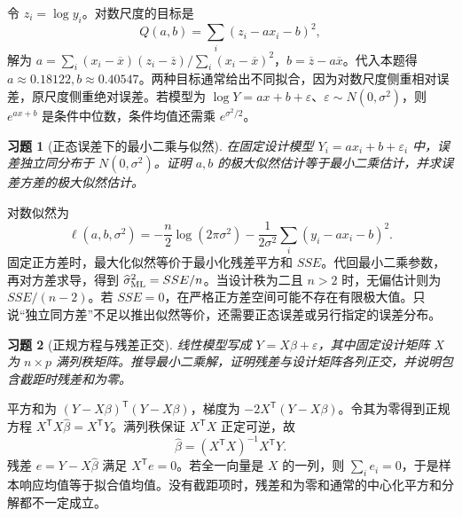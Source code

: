 \documentclass[12pt,fontset=fandol]{ctexart}
\newtheorem{exercise}{习题}[section]
\begin{document}
\begin{solve}\label{a:M-C26-1c}令 $z_i=\log y_i$。对数尺度的目标是\[Q(a,b)=\sum_i(z_i-ax_i-b)^2,\]解为 $a=\sum_i(x_i-\overline x)(z_i-\overline z)/\sum_i(x_i-\overline x)^2$，$b=\overline z-a\overline x$。代入本题得 $a\approx0.18122,b\approx0.40547$。两种目标通常给出不同拟合，因为对数尺度侧重相对误差，原尺度侧重绝对误差。若模型为 $\log Y=ax+b+\varepsilon$、$\varepsilon\sim N(0,\sigma^2)$，则 $e^{ax+b}$ 是条件中位数，条件均值还需乘 $e^{\sigma^2/2}$。\end{solve}

\begin{exercise}[正态误差下的最小二乘与似然]\label{q:M-C26-2d}
在固定设计模型 $Y_i=ax_i+b+\varepsilon_i$ 中，误差独立同分布于 $N(0,\sigma^2)$。证明 $a,b$ 的极大似然估计等于最小二乘估计，并求误差方差的极大似然估计。\par{}
\end{exercise}

\begin{solve}\label{a:M-C26-2d}对数似然为\[\ell(a,b,\sigma^2)=-\frac n2\log(2\pi\sigma^2)-\frac{1}{2\sigma^2}\sum_i(y_i-ax_i-b)^2.\]固定正方差时，最大化似然等价于最小化残差平方和 $SSE$。代回最小二乘参数，再对方差求导，得到 $\widehat\sigma^2_{\rm ML}=SSE/n$。当设计秩为二且 $n>2$ 时，无偏估计则为 $SSE/(n-2)$。若 $SSE=0$，在严格正方差空间可能不存在有限极大值。只说“独立同方差”不足以推出似然等价，还需要正态误差或另行指定的误差分布。\end{solve}

\begin{exercise}[正规方程与残差正交]\label{q:B16.1}
线性模型写成 $Y=X\beta+\varepsilon$，其中固定设计矩阵 $X$ 为 $n\times p$ 满列秩矩阵。推导最小二乘解，证明残差与设计矩阵各列正交，并说明包含截距时残差和为零。\par{}
\end{exercise}

\begin{solve}\label{a:B16.1}平方和为 $(Y-X\beta)^\mathsf T(Y-X\beta)$，梯度为 $-2X^\mathsf T(Y-X\beta)$。令其为零得到正规方程 $X^\mathsf TX\widehat\beta=X^\mathsf TY$。满列秩保证 $X^\mathsf TX$ 正定可逆，故\[\widehat\beta=(X^\mathsf TX)^{-1}X^\mathsf TY.\]残差 $e=Y-X\widehat\beta$ 满足 $X^\mathsf Te=0$。若全一向量是 $X$ 的一列，则 $\sum_ie_i=0$，于是样本响应均值等于拟合值均值。没有截距项时，残差和为零和通常的中心化平方和分解都不一定成立。\end{solve}
\end{document}
